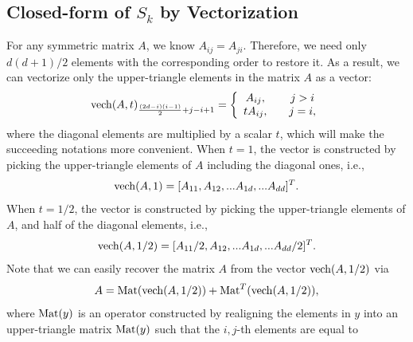 \documentclass{article}
\theoremstyle{remark}
\begin{document}
\subsection{Closed-form of $S_k$ by Vectorization}
For any symmetric matrix $A$, we know $A_{ij} = A_{ji}$. Therefore, we need only ${d(d+1)}/{2}$ elements with the corresponding order to restore it. As a result, we can vectorize only the upper-triangle elements in the matrix $A$ as a vector: 
\[
{\rm vech}(A,t)_{\frac{(2d-i)(i-1)}{2}+j-i+1} = \left\{
\begin{array}{cc}
A_{ij},    &\quad j>i\\
tA_{ij},   &\quad j=i,
\end{array}
\right.
\]
where the diagonal elements are multiplied by a scalar $t$, which will make the succeeding notations more convenient. When $t=1$, the vector is constructed by picking the upper-triangle elements of $A$ including the diagonal ones, i.e., 
\[
{\rm vech}(A,1) = [A_{11},A_{12},...A_{1d},...A_{dd}]^T.
\]
When $t=1/2$, the vector is constructed by picking the upper-triangle elements of $A$, and half of the diagonal elements, i.e.,
\[
{\rm vech}(A,{1}/{2}) = [A_{11}/2,A_{12},...A_{1d},...A_{dd}/2]^T.
\]
Note that we can easily recover the matrix $A$ from the vector ${\rm vech}(A,1/2)$ via
\[
A = {\rm Mat} ({\rm vech}(A,1/2)) + {\rm Mat}^T ({\rm vech}(A,1/2)),
\]
where ${\rm Mat}(y)$ is an operator constructed by realigning the elements in $y$ into an upper-triangle matrix ${\rm Mat} (y)$ such that the $i,j$-th elements are equal to
\end{document}
